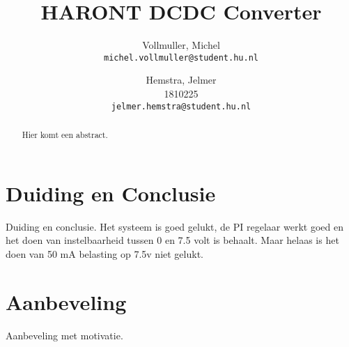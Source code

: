 \documentclass{article}
\title{HARONT DCDC Converter}
\author{
  Vollmuller, Michel\\
  \texttt{michel.vollmuller@student.hu.nl}
  \and
  Hemstra, Jelmer\\
  1810225\\
  \texttt{jelmer.hemstra@student.hu.nl}
}
\begin{document}
\maketitle

\begin{abstract}
    Hier komt een abstract.
\end{abstract}










\section{Duiding en Conclusie}
Duiding en conclusie.
Het systeem is goed gelukt, de PI regelaar werkt goed en het doen van instelbaarheid tussen 0 en 7.5 volt is behaalt. 
Maar helaas is het doen van 50 mA belasting op 7.5v niet gelukt.

\section{Aanbeveling}
Aanbeveling met motivatie.



\appendix
\end{document}

